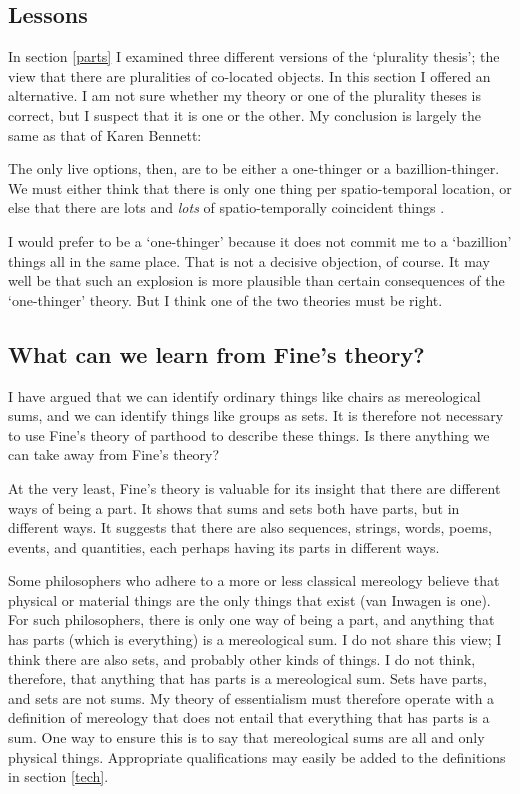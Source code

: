 \documentclass[11pt]{article}
\newenvironment{squote}{%
\begin{spacing}{1}
\begin{list}{}{%
\setlength{\labelwidth}{0pt}%
\rightmargin\leftmargin%
}
\item\relax
}{%
\end{list}%
\end{spacing}
}
\begin{document}
\begin{spacing}{1.5}
\section{Lessons}
\label{lessons-e}
In section \ref{parts} I examined three different versions of the
`plurality thesis'; the view that there are pluralities of co-located
objects.  In this section I offered an alternative.  I am not sure
whether my theory or one of the plurality theses is correct, but I
suspect that it is one or the other.  My conclusion is largely the
same as that of Karen Bennett:

\begin{squote}
The only live options, then, are to be either a one-thinger or a
bazillion-thinger.  We must either think that there is only one thing per
spatio-temporal location, or else that there are lots and \emph{lots} of
spatio-temporally coincident things \citeyearpar[358]{bennett2004}.
\end{squote}

I would prefer to be a `one-thinger' because it does not commit me to
a `bazillion' things all in the same place.  That is not a decisive
objection, of course.  It may well be that such an explosion is more
plausible than certain consequences of the `one-thinger' theory.  But
I think one of the two theories must be right.

\subsection{What can we learn from Fine's theory?}
\label{need-fine}
I have argued that we can identify ordinary things like chairs as
mereological sums, and we can identify things like groups as sets.  It
is therefore not necessary to use Fine's theory of parthood to
describe these things.  Is there anything we can take away from Fine's
theory?

At the very least, Fine's theory is valuable for its insight that
there are different ways of being a part.  It shows that sums and sets
both have parts, but in different ways.  It suggests that there are
also sequences, strings, words, poems, events, and quantities, each
perhaps having its parts in different ways.

Some philosophers who adhere to a more or less classical mereology
believe that physical or material things are the only things that
exist (van Inwagen is one).  For such philosophers, there is only one
way of being a part, and anything that has parts (which is everything)
is a mereological sum.  I do not share this view; I think there are
also sets, and probably other kinds of things.  I do not think,
therefore, that anything that has parts is a mereological sum.  Sets
have parts, and sets are not sums.  My theory of essentialism must
therefore operate with a definition of mereology that does not entail
that everything that has parts is a sum.  One way to ensure this is to
say that mereological sums are all and only physical things.
Appropriate qualifications may easily be added to the definitions in
section \ref{tech}.


\end{spacing}
\end{document}
